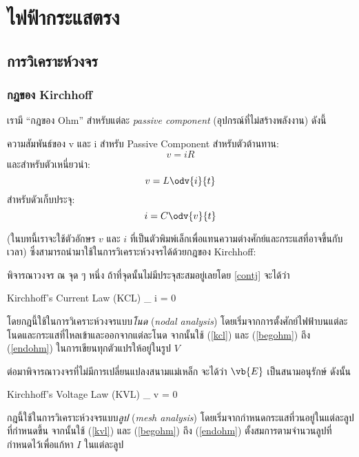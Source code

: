 \chapter{ไฟฟ้ากระแสตรง}
\section{การวิเคราะห์วงจร}

\subsection{กฎของ Kirchhoff}

เรามี ``กฎของ Ohm'' สำหรับแต่ละ \emph{passive component} (อุปกรณ์ที่ไม่สร้างพลังงาน) ดังนี้
\begin{lawbox}{ความสัมพันธ์ของ v และ i สำหรับ Passive Component}
    สำหรับตัวต้านทาน:
    \begin{equation}
        v = iR
    \end{equation}
    และสำหรับตัวเหนี่ยวนำ:
    \begin{equation}
        v = L\odv{i}{t} \label{endohm}
    \end{equation}
    สำหรับดัวเก็บประจุ:
    \begin{equation}
        i = C\odv{v}{t} \label{begohm}
    \end{equation}
\end{lawbox}
(ในบทนี้เราจะใช้ตัวอักษร $v$ และ $i$ ที่เป็นตัวพิมพ์เล็กเพื่อแทนความต่างศักย์และกระแสที่อาจขึ้นกับเวลา) ซึ่งสามารถนำมาใช้ในการวิเคราะห์วงจรได้ด้วยกฎของ Kirchhoff:

พิจารณาวงจร ณ จุด ๆ หนึ่ง ถ้าที่จุดนั้นไม่มีประจุสะสมอยู่เลยโดย \ref{contj} จะได้ว่า
\begin{ieqbox}{Kirchhoff's Current Law (KCL)}
    \sum_ i = 0\label{kcl}
\end{ieqbox}

โดยกฎนี้ใช้ในการวิเคราะห์วงจรแบบ\emph{โนด} (\emph{nodal analysis}) โดยเริ่มจากการตั้งศักย์ไฟฟ้าบนแต่ละโนดและกระแสที่ไหลเข้าและออกจากแต่ละโนด จากนั้นใช้ (\ref{kcl}) และ (\ref{begohm}) ถึง (\ref{endohm}) ในการเขียนทุกตัวแปรให้อยู่ในรูป $V$

ต่อมาพิจารณาวงจรที่ไม่มีการเปลี่ยนแปลงสนามแม่เหล็ก จะได้ว่า $\vb{E}$ เป็นสนามอนุรักษ์ ดังนั้น
\begin{ieqbox}{Kirchhoff's Voltage Law (KVL)}
    \sum_ v = 0\label{kvl}
\end{ieqbox}

กฎนี้ใช้ในการวิเคราะห์วงจรแบบ\emph{ลูป} (\emph{mesh analysis}) โดยเริ่มจากกำหนดกระแสที่วนอยู่ในแต่ละลูปที่กำหนดขึ้น จากนั้นใช้ (\ref{kvl}) และ (\ref{begohm}) ถึง (\ref{endohm}) ตั้งสมการตามจำนวนลูปที่กำหนดไว้เพื่อแก้หา $I$ ในแต่ละลูป

